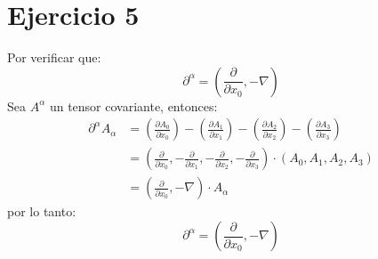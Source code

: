 \section*{Ejercicio 5}
Por verificar que:
    \begin{equation*}
        \partial^\alpha = \left(\frac{\partial}{\partial x_0}, -\nabla  \right)
    \end{equation*}
    Sea $A^\alpha$ un tensor covariante, entonces:
    \begin{align*}
        \partial^\alpha A_\alpha &= \left(\frac{\partial A_0}{\partial x_0} \right)-\left(\frac{\partial A_1}{\partial x_1} \right)-\left(\frac{\partial A_2}{\partial x_2} \right)-\left(\frac{\partial A_3}{\partial x_3} \right)\\
        &= \left(\frac{\partial}{\partial x_0},-\frac{\partial}{\partial x_1},-\frac{\partial}{\partial x_2},-\frac{\partial}{\partial x_3} \right) \cdot (A_0,A_1,A_2,A_3)\\
        &= \left(\frac{\partial}{\partial x_0},-\nabla \right) \cdot A_\alpha
    \end{align*}
    por lo tanto:
    \begin{equation*}
        \partial^\alpha = \left(\frac{\partial}{\partial x_0}, -\nabla  \right)
    \end{equation*}